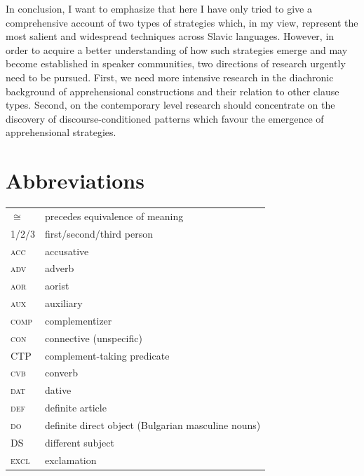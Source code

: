 \documentclass[output=paper,colorlinks,citecolor=brown]{langscibook}
\begin{document}
In conclusion, I want to emphasize that here I have only tried to give a comprehensive account of two types of strategies which, in my view, represent the most salient and widespread techniques across Slavic languages. However, in order to acquire a better understanding of how such strategies emerge and may become established in speaker communities, two directions of research urgently need to be pursued. First, we need more intensive research in the diachronic background of apprehensional constructions and their relation to other clause types. Second, on the contemporary level research should concentrate on the discovery of discourse-conditioned patterns which favour the emergence of apprehensional strategies.

\section*{Abbreviations}
\begin{tabularx}{.45\textwidth}{lQ}
$\cong$ & precedes equivalence of meaning \\
1/2/3 & first/second/third person \\
\textsc{acc} & accusative \\
\textsc{adv} & adverb \\
\textsc{aor} & aorist \\
\textsc{aux} & auxiliary \\
\textsc{comp} & complementizer \\
\textsc{con} & connective (unspecific) \\
CTP & complement-taking predicate \\
\textsc{cvb} & converb \\
\textsc{dat} & dative \\
\textsc{def} & definite article \\
\textsc{do} & definite direct object (Bulgarian masculine nouns) \\
DS & different subject \\
\textsc{excl} & exclamation\end{tabularx}%
\end{document}
